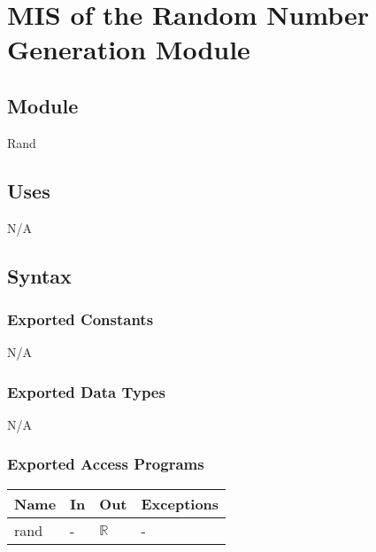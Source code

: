 \documentclass[12pt, titlepage]{article}
\begin{document}

\section{MIS of the Random Number Generation Module} \label{sec:Random}

\subsection{Module}
Rand

\subsection{Uses}

N/A

\subsection{Syntax}

\subsubsection{Exported Constants}
N/A

\subsubsection{Exported Data Types}

N/A

\subsubsection{Exported Access Programs}

\begin{center}
	\renewcommand*{\arraystretch}{1.5}
	\begin{tabular} {p{}  p{}  p{} 
			p{} } \hline 
		\textbf{Name} & \textbf{In} & \textbf{Out} & \textbf{Exceptions} \\ 
		\hline
		
		rand & - & $\mathbb{R}$ & - \\ \hline
	\end{tabular}
\end{center}
\end{document}
